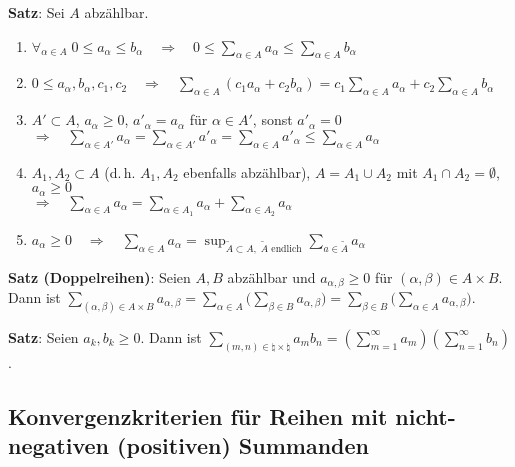 \textbf{Satz}: Sei $A$ abzählbar.
\begin{enumerate}
    \item $\forall_{\alpha \in A}\; 0 \le a_\alpha \le b_\alpha
    \quad\Rightarrow\quad
    0 \le \sum_{\alpha \in A} a_\alpha \le \sum_{\alpha \in A} b_\alpha$
    
    \item $0 \le a_\alpha, b_\alpha, c_1, c_2
    \quad\Rightarrow\quad
    \sum_{\alpha \in A} (c_1 a_\alpha + c_2 b_\alpha) =
    c_1 \sum_{\alpha \in A} a_\alpha + c_2 \sum_{\alpha \in A} b_\alpha$
    
    \item $A' \subset A$, \quad $a_\alpha \ge 0$, \quad
    $a'_\alpha = a_\alpha$ für $\alpha \in A'$,
    sonst $a'_\alpha = 0$ \\
    $\Rightarrow\quad \sum_{\alpha \in A'} a_\alpha
    = \sum_{\alpha \in A'} a'_\alpha
    = \sum_{\alpha \in A} a'_\alpha
    \le \sum_{\alpha \in A} a_\alpha$
    
    \item $A_1, A_2 \subset A$ (d.\,h. $A_1, A_2$ ebenfalls abzählbar), \quad
    $A = A_1 \cup A_2$ mit $A_1 \cap A_2 = \emptyset$, \quad
    $a_\alpha \ge 0$ \\
    $\Rightarrow\quad \sum_{\alpha \in A} a_\alpha =
    \sum_{\alpha \in A_1} a_\alpha + \sum_{\alpha \in A_2} a_\alpha$
    
    \item $a_\alpha \ge 0
    \quad\Rightarrow\quad \sum_{\alpha \in A} a_\alpha =
    \sup_{\widetilde{A} \subset A,\; \widetilde{A} \text{ endlich}}
    \sum_{a \in \widetilde{A}} a_\alpha$
\end{enumerate}

\linie

\textbf{Satz (Doppelreihen)}:
Seien $A, B$ abzählbar und $a_{\alpha,\beta} \ge 0$ für
$(\alpha,\beta) \in A \times B$. \\
Dann ist $\sum_{(\alpha,\beta) \in A \times B} a_{\alpha,\beta} =
\sum_{\alpha \in A} \Big(\sum_{\beta \in B} a_{\alpha,\beta}\Big) =
\sum_{\beta \in B} \Big(\sum_{\alpha \in A} a_{\alpha,\beta}\Big)$.

\textbf{Satz}:
Seien $a_k, b_k \ge 0$.
Dann ist $\sum_{(m,n) \in \natural \times \natural} a_m b_n =
\left(\sum_{m=1}^\infty a_m\right) \left(\sum_{n=1}^\infty b_n\right)$.

\subsection{%
    Konvergenzkriterien für Reihen mit nicht-negativen (positiven)
    Summanden%
}

